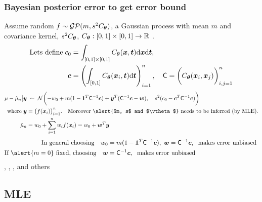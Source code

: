 \documentclass[10pt,compress,xcolor={usenames,dvipsnames}]{beamer} %
\newcommand{\bm}[1]{\boldsymbol{#1}}
\newcommand{\mCInv}{\mC^{-1}}
\newcommand{\dvx}{\dif {\vx}}
\newcommand{\dvt}{\dif {\vt}}
\begin{document}
\begin{frame}
\frametitle{Bayesian posterior error to get error bound}
\vspace*{-4ex}
\alert{Assume random}
$f \sim \mathcal{GP} (m, s^2C_{\boldsymbol{\theta}})$,
a \alert{Gaussian process} with mean $m$ and covariance kernel, $s^2C_{\boldsymbol{\theta}}$, $C_{\boldsymbol{\theta}}:[0,1] \times [0,1] \to \mathbb{R}$ .
\vspace*{-1ex}
\begin{align*}
\text{Lets define} \; c_0 &= \int_{[0,1] \times [0,1]} C_{\vtheta} (\vx,\vt) \dvx \dvt, 
\\
\vc& = \left( \int_{[0,1] } C_{\vtheta} (\vx_i,\vt) \dvt \right)_{i=1}^n,
\quad
\mC =  \biggl( C_{\vtheta} (\vx_i,\vx_j) \biggr)_{i,j=1}^n
\end{align*}
\pause
\vspace*{-3ex}
\begin{align*}
\mu - \hmu_n  \big \vert \vy & \; \sim \;
\cn
\biggl(-w_0 +
m(1- \bm{1}^T \mathsf{C}^{-1}\vc) +
\vy^T (\mathsf{C}^{-1}\vc - \vw), \quad s^2(c_0 - \vc ^T \mathsf{C}^{-1} \vc)
\biggr)
\\
\text{where} \; \vy &= \bigl(f(\vx_i)\bigr)_{i=1}^n. \quad \text{Moreover \alert{$m, s$ and $\vtheta$} needs to be inferred (by MLE)}.
\\
\hmu_n &= w_0 + \sum_{i=1}^n w_i f(\vx_i) = w_0 + \vw^T \vy
\end{align*}
\pause
\vspace*{-3ex}
\begin{align*}
\text{In general choosing} \quad
w_0 & = m(1 - \vone^T \mCInv \vc)
, 
\;
\vw = \mathsf{C}^{-1}\vc, \; \text{ makes error unbiased }
\\
\text{If $\alert{m = 0}$ fixed, choosing} \quad
\vw & =
\mathsf{C}^{-1}\vc, \; \text{ makes error unbiased }
\end{align*}
, , ,  and others
\end{frame}









\subsection{MLE}
\end{document}
